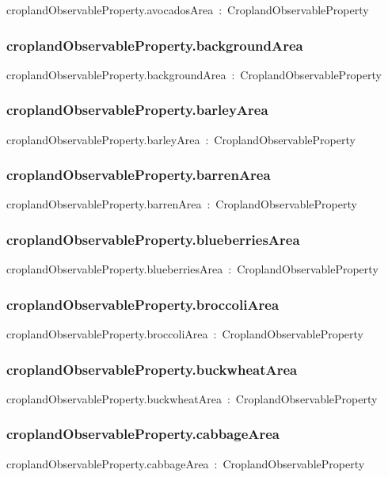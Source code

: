 \documentclass{article}
\begin{document}
croplandObservableProperty.avocadosArea~:~CroplandObservableProperty

\subsubsection*{croplandObservableProperty.backgroundArea}

croplandObservableProperty.backgroundArea~:~CroplandObservableProperty

\subsubsection*{croplandObservableProperty.barleyArea}

croplandObservableProperty.barleyArea~:~CroplandObservableProperty

\subsubsection*{croplandObservableProperty.barrenArea}

croplandObservableProperty.barrenArea~:~CroplandObservableProperty

\subsubsection*{croplandObservableProperty.blueberriesArea}

croplandObservableProperty.blueberriesArea~:~CroplandObservableProperty

\subsubsection*{croplandObservableProperty.broccoliArea}

croplandObservableProperty.broccoliArea~:~CroplandObservableProperty

\subsubsection*{croplandObservableProperty.buckwheatArea}

croplandObservableProperty.buckwheatArea~:~CroplandObservableProperty

\subsubsection*{croplandObservableProperty.cabbageArea}

croplandObservableProperty.cabbageArea~:~CroplandObservableProperty
\end{document}
